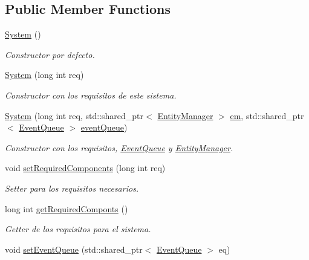 \subsection*{Public Member Functions}
\begin{DoxyCompactItemize}
\item 
\hyperlink{classant_1_1_system_aa989449604319d4b374b44f68fc8cf26}{System} ()
\begin{DoxyCompactList}\small\item\em Constructor por defecto. \end{DoxyCompactList}\item 
\hyperlink{classant_1_1_system_a0561fbb47b681fabd4ec27e632b57929}{System} (long int req)
\begin{DoxyCompactList}\small\item\em Constructor con los requisitos de este sistema. \end{DoxyCompactList}\item 
\hyperlink{classant_1_1_system_a276b368d0c1612d762c22a090772ae7b}{System} (long int req, std\+::shared\+\_\+ptr$<$ \hyperlink{classant_1_1_entity_manager}{Entity\+Manager} $>$ \hyperlink{classant_1_1_system_a5661d872ff769be150bd4e9a9552f6b9}{em}, std\+::shared\+\_\+ptr$<$ \hyperlink{classant_1_1_event_queue}{Event\+Queue} $>$ \hyperlink{classant_1_1_system_a27e1814e13d161b5ef0e848e3da16d29}{event\+Queue})
\begin{DoxyCompactList}\small\item\em Constructor con los requisitos, \hyperlink{classant_1_1_event_queue}{Event\+Queue} y \hyperlink{classant_1_1_entity_manager}{Entity\+Manager}. \end{DoxyCompactList}\item 
void \hyperlink{classant_1_1_system_a35662ff3739ff4290df1106bfdccfaca}{set\+Required\+Components} (long int req)
\begin{DoxyCompactList}\small\item\em Setter para los requisitos necesarios. \end{DoxyCompactList}\item 
long int \hyperlink{classant_1_1_system_a2d94338969f43d4fd2fd972deb099258}{get\+Required\+Componts} ()
\begin{DoxyCompactList}\small\item\em Getter de los requisitos para el sistema. \end{DoxyCompactList}\item 
void \hyperlink{classant_1_1_system_a1effe9f0e5615e516a34be02d5895434}{set\+Event\+Queue} (std\+::shared\+\_\+ptr$<$ \hyperlink{classant_1_1_event_queue}{Event\+Queue} $>$ eq)

\end{DoxyCompactItemize}
